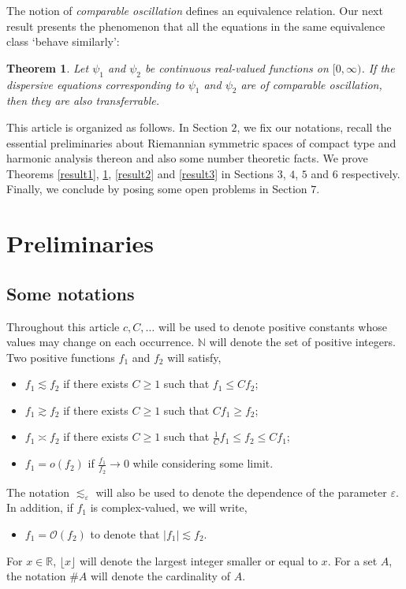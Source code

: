 \documentclass[12pt]{amsart}
\newtheorem{theorem}{Theorem}[section]
\theoremstyle{definition}
\newcommand{\R}{\mathbb R}%
\newcommand{\N}{\mathbb N}%
\numberwithin{equation}{section}
\begin{document}
The notion of {\it comparable oscillation} defines an equivalence relation. Our next result presents the phenomenon that all the equations in the same equivalence class `behave similarly': 

\begin{theorem} \label{transference_principle}
Let $\psi_1$ and $\psi_2$ be continuous real-valued functions on $[0,\infty)$. If the dispersive equations corresponding to $\psi_1$ and $\psi_2$ are of comparable oscillation, then they are also transferrable.  
\end{theorem} 

This article is organized as follows. In Section $2$, we fix our notations, recall the essential preliminaries about Riemannian symmetric spaces of compact type and harmonic analysis thereon and also some number theoretic facts. We prove Theorems \ref{result1}, \ref{transference_principle}, \ref{result2} and \ref{result3} in Sections $3$, $4$, $5$ and $6$ respectively. Finally, we conclude by posing some open problems in Section $7$.  

\section{Preliminaries}

\subsection{Some notations} Throughout this article $c,C,\dots$ will be used to denote positive constants whose values may change on each occurrence. $\N$ will denote the set of positive integers. Two positive functions $f_1$ and $f_2$ will satisfy,
\begin{itemize}
\item  $f_1 \lesssim f_2$ if there exists $C\ge 1$ such that $f_1 \le Cf_2$;
\item  $f_1 \gtrsim f_2$ if there exists $C\ge 1$ such that $Cf_1 \ge f_2$;
\item $f_1 \asymp f_2$ if there exists $C\ge 1$ such that $\frac{1}{C}f_1 \le f_2 \le Cf_1$;
\item $f_1=o(f_2)$ if $\frac{f_1}{f_2} \to 0$ while considering some limit.
\end{itemize}
The notation $\lesssim_\varepsilon$ will also be used to denote the dependence of the parameter $\varepsilon$. In addition, if $f_1$ is complex-valued, we will write,
\begin{itemize}
\item $f_1=\mathcal{O}(f_2)$ to denote that $|f_1| \lesssim f_2$\:.
\end{itemize}
For $x \in \R$, $\lfloor x \rfloor$ will denote the largest integer smaller or equal to $x$. For a set $A$, the notation $\#A$ will denote the cardinality of $A$.
\end{document}
